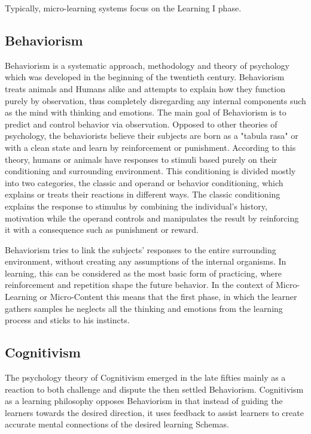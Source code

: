 Typically, micro-learning systems focus on the Learning I phase.

\subsection{Behaviorism}

Behaviorism is a systematic approach, methodology and theory of psychology which
was developed in the beginning of the twentieth century. Behaviorism treats 
animals and Humans alike and attempts to explain how they function 
purely by observation, thus completely disregarding any internal components such 
as the mind with thinking and emotions. The main goal of Behaviorism is to predict
and control behavior via observation. Opposed to other theories of psychology, the
behaviorists believe their subjects are born as a "tabula rasa" or with a 
clean state and learn by reinforcement or punishment. According to this theory,
humans or animals have responses to stimuli based purely on their conditioning
and surrounding environment. This conditioning is divided mostly into two 
categories, the classic and operand or behavior conditioning, which explains or 
treats their reactions in different ways. The classic conditioning explains the 
response to stimulus by combining the individual's history, motivation while 
the operand controls and manipulates the result by reinforcing it with a 
consequence such as punishment or reward.

Behaviorism tries to link the subjects' responses to the entire surrounding 
environment, without creating any assumptions of the internal organisms. In 
learning, this can be considered as the most basic form of practicing, where 
reinforcement and repetition shape the future behavior. In the context of 
Micro-Learning or Micro-Content this means that the first phase, in which the 
learner gathers samples he neglects all the thinking and emotions from the learning
process and sticks to his instincts.



\subsection{Cognitivism}

The psychology theory of Cognitivism emerged in the late fifties mainly as a 
reaction to both challenge and dispute the then settled Behaviorism.
Cognitivism as a learning philosophy opposes Behaviorism in that instead of 
guiding the learners towards the desired direction, it uses feedback to assist 
learners to create accurate mental connections of the desired learning Schemas.

